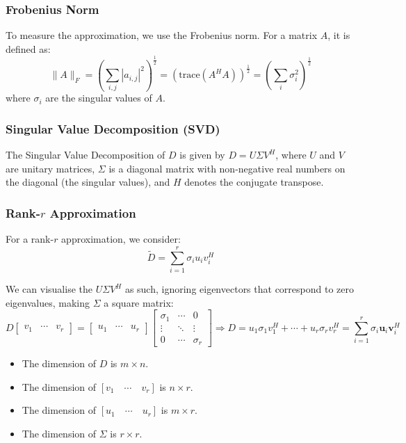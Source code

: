 \subsubsection*{Frobenius Norm}

To measure the approximation, we use the Frobenius norm. For a matrix \( A \), it is defined as:
\[
\|A\|_F = \left( \sum_{i,j} |a_{i,j}|^2 \right)^{\frac{1}{2}} = \left( \text{trace}(A^HA) \right)^{\frac{1}{2}} = \left( \sum_{i} \sigma_i^2 \right)^{\frac{1}{2}}
\]
where \( \sigma_i \) are the singular values of \( A \).

\subsubsection*{Singular Value Decomposition (SVD)}

The Singular Value Decomposition of \( D \) is given by \( D = U\Sigma V^H \), where \( U \) and \( V \) are unitary matrices, \( \Sigma \) is a diagonal matrix with non-negative real numbers on the diagonal (the singular values), and \( H \) denotes the conjugate transpose.

\subsubsection*{Rank-\( r \) Approximation}

For a rank-\( r \) approximation, we consider:
\[
\tilde{D} = \sum_{i=1}^r \sigma_i u_i v_i^H
\]

We can visualise the \( U\Sigma V^H \) as such, ignoring eigenvectors that correspond to zero eigenvalues, making \( \Sigma \) a square matrix:
\[
D\begin{bmatrix}v_1&\cdots&v_r\end{bmatrix} = \begin{bmatrix}u_1&\cdots&u_r\end{bmatrix}\begin{bmatrix}\sigma_1&\cdots&0\\\vdots&\ddots&\vdots\\0&\cdots&\sigma_r\end{bmatrix} \Rightarrow D = u_1\sigma_1v_1^H + \cdots + u_r\sigma_rv_r^H = \sum_{i=1}^r \sigma_i \bm{u}_i \bm{v}_i^H
\]

\begin{itemize}
    \item The dimension of \( D \) is \( m \times n \).
    \item The dimension of \( [v_1 \quad \cdots \quad v_r] \) is \( n \times r \).
    \item The dimension of \( [u_1 \quad \cdots \quad u_r] \) is \( m \times r \).
    \item The dimension of \( \Sigma \) is \( r \times r \).
\end{itemize}

